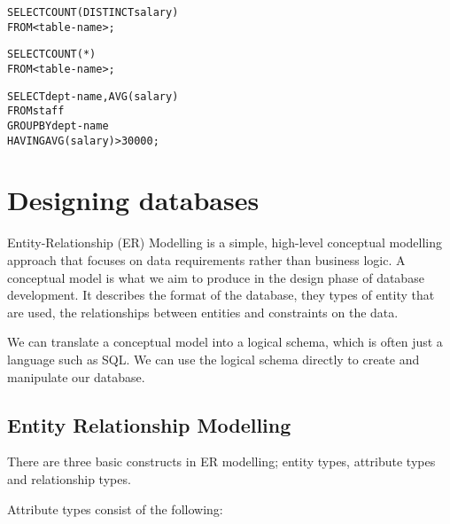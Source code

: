 \begin{mymulticols}
  \begin{alltt}
    SELECT COUNT(DISTINCT salary)\\
    FROM <table-name>;  
  \end{alltt}

  \begin{alltt}
    SELECT COUNT(*)\\
    FROM <table-name>;
  \end{alltt}

  \begin{alltt}
    SELECT dept-name, AVG(salary)\\
    FROM staff\\
    GROUP BY dept-name\\
    HAVING AVG(salary) > 30000;
  \end{alltt}

\end{mymulticols}

\section{Designing databases}

Entity-Relationship (ER) Modelling is a simple, high-level conceptual modelling
approach that focuses on data requirements rather than business logic. A
conceptual model is what we aim to produce in the design phase of database
development. It describes the format of the database, they types of entity that
are used, the relationships between entities and constraints on the data.

We can translate a conceptual model into a logical schema, which is often just a
language such as SQL. We can use the logical schema directly to create and
manipulate our database.

\subsection{Entity Relationship Modelling}

There are three basic constructs in ER modelling; entity types, attribute types
and relationship types.

Attribute types consist of the following:

